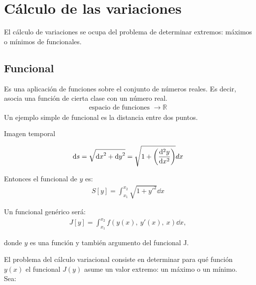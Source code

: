 \documentclass[../main]{subfiles}
\begin{document}
\section{Cálculo de las variaciones}
El cálculo de variaciones se ocupa del problema de determinar extremos: máximos o mínimos de funcionales.
\subsection{Funcional}
Es una aplicación de funciones sobre el conjunto de números reales. Es decir, asocia una función de cierta clase con un número real.
\begin{align*}
    \text{espacio de funciones } \rightarrow \mathbb{R}
\end{align*}
Un ejemplo simple de funcional es la distancia entre dos puntos.

\begin{InfoBox}[ht]
\centering
{}\par
  \caption{Imagen temporal\label{fg:A}}  
\end{InfoBox}

\begin{align*}
    \dd{s}=\sqrt{\dd{x}^2+\dd{y}^2}=\sqrt{1+\left(\dv[2]{y}{x}\right)}dx
\end{align*}

Entonces el funcional de $y$ es:
\begin{align}
    S[y]=\int_{x_{1}}^{x_{2}}\sqrt{1+{y'}^{2}}\dd{x}
\end{align}

Un funcional genérico será:
\begin{align}
    J[y]=\int_{x_{1}}^{x_{2}}f\left(y\left(x\right),\ y'\left(x\right),\ x\right)\dd{x},
\end{align}

\hangindent=0.7cm donde $y$ es una función y también argumento del funcional J.

El problema del cálculo variacional consiste en determinar para qué función $y(x)$ el funcional $J(y)$ asume un valor extremo: un máximo o un mínimo.\\
Sea:
\end{document}
